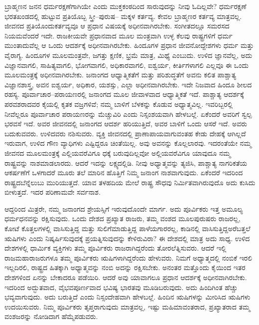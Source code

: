 \vskip   -0.5cm

ಬ್ರಾಹ್ಮಣನ ಜನನ ಧರ್ಮರಕ್ಷಣೆಗಾಗಿಯೇ ಎಂದು ಮುಕ್ತಕಂಠದಿಂದ ಸಾರುವುದನ್ನು ನೀವು ಓದಿಲ್ಲವೇ? ಧರ್ಮರಕ್ಷಣೆ ಭರತಖಂಡದಲ್ಲಿ ಹುಟ್ಟುವ ಪ್ರತಿಯೊಬ್ಬ ಸ್ತ್ರೀ–ಪುರುಷ–\- ಮಕ್ಕಳ ಕರ್ತವ್ಯ. ಕೇವಲ ಬ್ರಾಹ್ಮಣರ ಕರ್ತವ್ಯ ಮಾತ್ರವಲ್ಲ. ಜೀವನದ ಪ್ರತಿಯೊಂದು\break ಕರ್ತವ್ಯವೂ ಆ ಪ್ರಧಾನ ವಿಷಯಕ್ಕೆ ಅಧೀನವಾಗಿರಬೇಕು. ಸಂಗೀತದಲ್ಲೂ ಸಮರಸದ ನಿಯಮವೆಂದರೆ ಇದೇ. ರಾಜಕೀಯವೇ ಪ್ರಧಾನವಾದ ಮೂಲ ಮಂತ್ರವಾಗಿ ಉಳ್ಳ ಕೆಲವು ರಾಷ್ಟ್ರಗಳಿಗೆ ಧರ್ಮ ಮುಂತಾದುವೆಲ್ಲ ಆ ಒಂದು ಆದರ್ಶಕ್ಕೆ ಅಧೀನವಾಗಿರಬೇಕು. ಹಿಂದೂಗಳ ಪ್ರಧಾನ ಜೀವನೋದ್ದೇಶಗಳು ಧರ್ಮ ಮತ್ತು ವೈರಾಗ್ಯ. ಹಿಂದೂಗಳ ಮೂಲಮಂತ್ರವೇ, ಜಗತ್ತು ಕ್ಷಣಿಕ, ಭ್ರಮೆ ಮಾತ್ರ, ಮಿಥ್ಯೆ ಎಂಬುದು. ಉಳಿದ ಜ್ಞಾನವೆಲ್ಲ, ಅದು ವಿಜ್ಞಾನವಾಗಲಿ, ಸಾಹಿತ್ಯವಾಗಲಿ, ಭೋಗವಾಗಲಿ, ಅಧಿಕಾರವಾಗಲಿ, ಐಶ್ವರ್ಯ, ಕೀರ್ತಿಗಳಾಗಲಿ ಎಲ್ಲವೂ ಈ ಒಂದು ಮೂಲಮಂತ್ರಕ್ಕೆ ಅಧೀನವಾಗಿರಬೇಕು. ಜನಾಂಗದ ಆಧ್ಯಾತ್ಮಿಕತೆಗೆ ಮತ್ತು ಪರಿಶುದ್ಧತೆಗೆ ಅವನು ಕಲಿತ ಪಾಶ್ಚಾತ್ಯ ವಿಜ್ಞಾನಶಾಸ್ತ್ರ, ಅವನ ಐಶ್ವರ್ಯ, ಅಧಿಕಾರ, ಯಶಸ್ಸು, ಎಲ್ಲಾ ಅಧೀನವಾಗಿರಬೇಕು. ಇದೇ ನಿಜವಾದ ಹಿಂದೂ ಶೀಲದ ರಹಸ್ಯ. ಪೂರ್ವಾಚಾರ–ಪರಾಯಣರಲ್ಲಿ ಜನಾಂಗದ ಮೂಲ ಜೀವಾಳವಾದ ಆಧ್ಯಾತ್ಮಿಕತೆ ಇದೆ. ಪಾಶ್ಚಾತ್ಯ ಆದರ್ಶಕ್ಕೆ ಪರವಶರಾದವರ ಕೈಯಲ್ಲಿ ಕೃತಕ ವಜ್ರಗಳಿವೆ; ನಮ್ಮ ಬಾಳಿಗೆ ಬೆಳಕನ್ನು ಕೊಡುವ ಅಧ್ಯಾತ್ಮವಿಲ್ಲ. ಇವರಿಬ್ಬರಲ್ಲಿ ನೀವೆಲ್ಲರೂ ಪೂರ್ವಾಚಾರ ಪರಾಯಣರನ್ನು ಮೆಚ್ಚುವಿರಿ ಎಂದು ನಿಸ್ಸಂಶಯವಾಗಿ ಹೇಳಬಲ್ಲೆ. ಏಕೆಂದರೆ ಅವರಿಗೆ ಸ್ವಲ್ಪ ಭರವಸೆ ಇದೆ. ಅವರ ಜೀವನದಲ್ಲಿ ಜನಾಂಗದ ಆದರ್ಶ ಹರಿಯುತ್ತಿದೆ, ಅವರ ಬಾಳಿಗೆ ಒಂದು ಆಸರೆ ಇದೆ. ಅವರು ಬದುಕುವವರು. ಉಳಿದವರು ನಶಿಸುವರು. ವ್ಯಕ್ತಿ ಜೀವನದಲ್ಲಿ ಪ್ರಾಣಾಪಾಯವಾಗುವಂತಹ ಕೇಡು ದೇಹಕ್ಕೆ ಆಗಿಲ್ಲದೆ ಇರುವಾಗ, ಉಳಿದ ಗೌಣ ವ್ಯಾಧಿಗಳು ಎಷ್ಟಿದ್ದರೂ ಚಿಂತೆಯಿಲ್ಲ. ಅವು ಅವನನ್ನು ಕೊಲ್ಲಲಾರವು. ಇದರಂತೆಯೇ ನಮ್ಮ ಜೀವನದ ಮೂಲಮಂತ್ರಕ್ಕೆ ಎಲ್ಲಿಯವರೆವಿಗೂ ಧಕ್ಕೆ ಬರುವುದಿಲ್ಲವೋ ಅಲ್ಲಿಯವರೆವಿಗೂ ಯಾವುದೂ ನಮ್ಮ ರಾಷ್ಟ್ರವನ್ನು ನಾಶಮಾಡಲಾರದು. ಆದರೆ ಇದನ್ನು ಲಕ್ಷ್ಯದಲ್ಲಿಡಿ. ನೀವು ಅಧ್ಯಾತ್ಮವನ್ನು ತ್ಯಜಿಸಿ, ಪಾಶ್ಚಾತ್ಯ ನಾಗರಿಕತೆಯ ಆಕರ್ಷಣೆಗೆ ಒಳಗಾದರೆ ಮೂರು ತಲೆ ಮಾರಿನ ಹೊತ್ತಿಗೆ ನಿಮ್ಮ ಜನಾಂಗ ನಾಶವಾಗುವುದು. ಏಕೆಂದರೆ ಇದರಿಂದ ರಾಷ್ಟ್ರದ\break ಬೆನ್ನೆಲುಬು ಮುರಿಯುತ್ತದೆ. ಯಾವ ತಳಹದಿಯ ಮೇಲೆ ರಾಷ್ಟ್ರ ಸೌಧವು ನಿರ್ಮಿತವಾಗಿರುವುದೊ ಅದು ಕುಸಿದು ಬೀಳುತ್ತದೆ. ಇದರ ಪರಿಣಾಮವೇ ಸರ್ವನಾಶ.

ಆದ್ದರಿಂದ ಮಿತ್ರರೇ, ನಮ್ಮ ಜನಾಂಗದ ಶ್ರೇಯಸ್ಸಿಗೆ ಇರುವುದೊಂದೇ ಮಾರ್ಗ. ಅದು ಪೂರ್ವಿಕರು ಇತ್ತ ಅಮೂಲ್ಯ ಧರ್ಮಧನವನ್ನು ರಕ್ಷಿಸುವುದು. ಒಂದು ದೇಶದ ಪ್ರಖ್ಯಾತ ರಾಜರು, ತಮ್ಮ ವಂಶದ ಮೂಲಪುರುಷರು ರಾಜರಲ್ಲ, ಕೋಟೆ ಕೊತ್ತಲಗಳಲ್ಲಿ ವಾಸಿಸುತ್ತಿದ್ದ ಮತ್ತು ಸುಲಿಗೆಮಾಡುತ್ತಿದ್ದ ಪಾಳೆಯಗಾರರಲ್ಲ, ಕಾಡಿನಲ್ಲಿ ವಾಸಿಸುತ್ತಿದ್ದ\break ಅರೆಬತ್ತಲೆ ಋಷಿಗಳು ಎಂದು ನಿಷ್ಕರ್ಷಿಸುವುದಕ್ಕೆ ಪ್ರಯತ್ನಿಸುವುದನ್ನು ಕೇಳಿರುವಿರಾ? ಈ ದೇಶದಲ್ಲಿ ಮಾತ್ರ ಅದು ಸಾಧ್ಯ. ಉಳಿದ ದೇಶಗಳಲ್ಲಿ ಧಾರ್ಮಿಕ ವ್ಯಕ್ತಿಗಳು ತಮ್ಮ ಪೂರ್ವಿಕರು ರಾಜರಾಗಿದ್ದರೆಂದು ತೋರಲೆತ್ನಿಸುವರು. ಆದರೆ ಇಲ್ಲಿ ರಾಜಮಹಾರಾಜರು\break ಗಳೂ ತಮ್ಮ ಪೂರ್ವಿಕರು ಋಷಿಗಳಾಗಿದ್ದರೆಂದು ಹೇಳುವರು. ನಿಮಗೆ ಅಧ್ಯಾತ್ಮದಲ್ಲಿ ನಂಬಿಕೆ ಇರಲಿ ಇಲ್ಲದಿರಲಿ, ರಾಷ್ಟ್ರದ ಹಿತಕ್ಕಾಗಿ ಅಧ್ಯಾತ್ಮವನ್ನು ನಂಬಿ ಅದನ್ನು ರಕ್ಷಿಸಬೇಕು. ಅನಂತರ ಮತ್ತೊಂದು ಕೈಯಿಂದ ಇತರ ದೇಶಗಳಿಂದ ಏನನ್ನು ಬೇಕಾದರೂ ಪಡೆಯಿರಿ. ಆದರೆ ಅವು ಯಾವಾಗಲೂ ಪ್ರಧಾನ ಆದರ್ಶಕ್ಕೆ ಅಧೀನವಾಗಿರಬೇಕು. ಇದರಿಂದ ಅದ್ಭುತವಾದ, ವೈಭವಪೂರ್ಣವಾದ ಭವಿಷ್ಯ ಭಾರತವು ಮೂಡಿಬರುವುದು. ಅದು ಹಿಂದಿಗಿಂತ ಹೆಚ್ಚು ಭವ್ಯವಾಗುವುದು. ಅದು ಬರುತ್ತಿದೆ ಎಂದು ನಿಸ್ಸಂದೇಹವಾಗಿ ಹೇಳಬಲ್ಲೆ. ಹಿಂದಿನ ಋಷಿಗಳನ್ನು ಮೀರಿಸಿದ ಋಷಿಗಳು ಉದಯಿಸುವರು. ನಿಮ್ಮ ಪೂರ್ವಿಕರು ತೃಪ್ತರಾಗುವುದು ಮಾತ್ರವಲ್ಲ, ಇಷ್ಟು ಮಹಿಮಾವಂತರಾದ, ಪ್ರಖ್ಯಾತರಾದ ತಮ್ಮ ವಂಶಜರನ್ನು ನೋಡಿದಾಗ ಹೆಮ್ಮೆಪಡುವರು.

